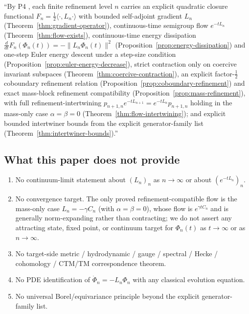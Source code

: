 \documentclass[11pt, a4paper]{amsart}
\theoremstyle{definition}
\begin{document}
``By P4 \cite{ClosureDynamics}, each finite refinement level
$n$ carries an explicit quadratic closure functional
$F_n = \tfrac{1}{2}\langle \cdot, L_n \cdot \rangle$ with bounded
self-adjoint gradient $L_n$ (Theorem~\ref{thm:gradient-operator}),
continuous-time semigroup flow $e^{-t L_n}$
(Theorem~\ref{thm:flow-exists}), continuous-time energy
dissipation $\frac{d}{dt} F_n(\Phi_n(t)) = -\|L_n \Phi_n(t)\|^2$
(Proposition~\ref{prop:energy-dissipation}) and one-step Euler
energy descent under a step-size condition
(Proposition~\ref{prop:euler-energy-decrease}), strict contraction
only on coercive invariant subspaces
(Theorem~\ref{thm:coercive-contraction}), an explicit
factor-$\tfrac{1}{2}$ coboundary refinement relation
(Proposition~\ref{prop:coboundary-refinement}) and exact
mass-block refinement compatibility
(Proposition~\ref{prop:mass-refinement}), with full
refinement-intertwining $p_{n+1, n} e^{-t L_{n+1}} = e^{-t L_n}
p_{n+1, n}$ holding in the mass-only case $\alpha = \beta = 0$
(Theorem~\ref{thm:flow-intertwining}); and explicit bounded
intertwiner bounds from the explicit generator-family list
(Theorem~\ref{thm:intertwiner-bounds}).''

\subsection{What this paper does not provide}

\begin{enumerate}
\item No continuum-limit statement about $(L_n)_n$ as $n \to
  \infty$ or about $(e^{-t L_n})_n$.
\item No convergence target. The only proved
  refinement-compatible flow is the mass-only case $L_n =
  -\gamma C_n$ (with $\alpha = \beta = 0$), whose flow is
  $e^{\gamma t C_n}$ and is generally norm-expanding rather
  than contracting; we do not assert any attracting state, fixed
  point, or continuum target for $\Phi_n(t)$ as $t \to \infty$
  or as $n \to \infty$.
\item No target-side metric / hydrodynamic / gauge / spectral /
  Hecke / cohomology / CTM/TM correspondence theorem.
\item No PDE identification of $\dot\Phi_n = -L_n \Phi_n$ with
  any classical evolution equation.
\item No universal Borel/equivariance principle beyond the
  explicit generator-family list.
\end{enumerate}

\appendix
\end{document}
